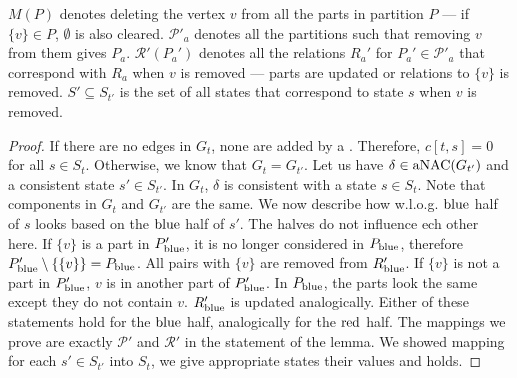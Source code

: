 \( M(P) \) denotes deleting the vertex \( v \) from all the parts in partition \( P \)
--- if \( \{v\} \in P \), \( \emptyset \) is also cleared.
\( \mathcal{P'}_a \) denotes all the partitions such that removing \( v \) from them gives \( P_a \).
\( \mathcal{R'}(P_a') \) denotes all the relations \( R_a' \)
for \( P_a' \in \mathcal{P'}_a \) that correspond with \( R_a \) when \( v \) is removed
--- parts are updated or relations to \( \{v\} \) is removed.
\( S' \subseteq S_{t'} \) is the set of all states that
correspond to state \( s \) when \( v \) is removed.
%
\begin{proof}
	If there are no edges in \( G_t \), none are added by a \ForgetVertexNode{}.
	Therefore, \( c[t, s] = 0 \) for all \( s \in S_t \).
	Otherwise, we know that \( G_t = G_{t'} \).
	Let us have \( \delta \in \operatorname{aNAC}(G_{t'}) \)
	and a consistent state \( s' \in S_{t'} \).
	In \( G_t \), \( \delta \) is consistent with a state \( s \in S_t \).
	Note that components in \( G_t \) and \( G_{t'} \) are the same.
	We now describe how w.l.o.g. \( \text{blue} \) half of \( s \) looks
	based on the \( \text{blue} \) half of \( s' \).
	The halves do not influence ech other here.
	If \( \{v\} \) is a part in \( P_{\text{blue}}' \),
	it is no longer considered in \( P_{\text{blue}} \),
	therefore \( P_{\text{blue}}' \setminus \{\{v\}\} = P_{\text{blue}} \).
	All pairs with \( \{v\} \) are removed from \( R_{\text{blue}}' \).
	If \( \{v\} \) is not a part in \( P_{\text{blue}}' \),
	\( v \) is in another part of \( P_{\text{blue}}' \).
	In \( P_{\text{blue}} \), the parts look the same except they do not
	contain \( v \). \( R_{\text{blue}}' \) is updated analogically.
	Either of these statements hold for the \( \text{blue} \) half,
	analogically for the \( \text{red} \) half.
	The mappings we prove are exactly \( \mathcal{P'} \) and \( \mathcal{R'} \)
	in the statement of the lemma.
	We showed mapping for each \( s' \in S_{t'} \) into \( S_t \),
	we give appropriate states their values and  holds.
\end{proof}
%

\subsubsection*{\IntroduceEdgeNode{}}

